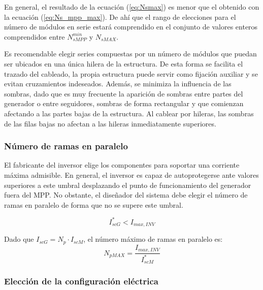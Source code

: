 En general, el resultado de la ecuación (\ref{eq:Nsmax}) es menor que
el obtenido con la ecuación (\ref{eq:Ns_mpp_max}). De ahí que el rango
de elecciones para el número de módulos en serie estará comprendido en
el conjunto de valores enteros comprendidos entre $N_{sMPP}^{min}$ y $N_{sMAX}$.

Es recomendable elegir series compuestas por un número de módulos
que puedan ser ubicados en una única hilera de la estructura. De esta
forma se facilita el trazado del cableado, la propia estructura puede
servir como fijación auxiliar y se evitan cruzamientos indeseados.
Además, se minimiza la influencia de las sombras, dado que es muy
frecuente la aparición de sombras entre partes del generador o entre
seguidores, sombras de forma rectangular y que comienzan afectando
a las partes bajas de la estructura. Al cablear por hileras, las sombras
de las filas bajas no afectan a las hileras inmediatamente superiores.

\subsubsection{Número de ramas en paralelo}
\label{sec:Np}

El fabricante del inversor elige los componentes para soportar una
corriente máxima admisible. En general, el inversor es capaz de autoprotegerse
ante valores superiores a este umbral desplazando el punto de funcionamiento
del generador fuera del MPP. No obstante, el diseñador del sistema
debe elegir el número de ramas en paralelo de forma que no se supere
este umbral.

\begin{equation}
I_{scG}^{*}<I_{max,INV}\end{equation}

Dado que $I_{scG}=N_p \cdot I_{scM}$, el número máximo de ramas en
paralelo es:
\begin{equation}
  \label{eq:NpMAX}
  N_{pMAX}=\frac{I_{max,INV}}{I_{scM}^{*}}
\end{equation}


\subsubsection{Elección de la configuración eléctrica}

